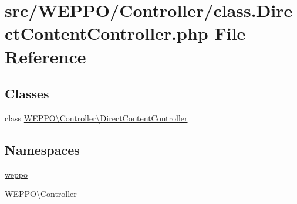 \hypertarget{class_8DirectContentController_8php}{}\section{src/\+W\+E\+P\+P\+O/\+Controller/class.Direct\+Content\+Controller.\+php File Reference}
\label{class_8DirectContentController_8php}
\subsection*{Classes}
\begin{DoxyCompactItemize}
\item 
class \hyperlink{classWEPPO_1_1Controller_1_1DirectContentController}{W\+E\+P\+P\+O\textbackslash{}\+Controller\textbackslash{}\+Direct\+Content\+Controller}
\end{DoxyCompactItemize}
\subsection*{Namespaces}
\begin{DoxyCompactItemize}
\item 
 \hyperlink{namespaceweppo}{weppo}
\item 
 \hyperlink{namespaceWEPPO_1_1Controller}{W\+E\+P\+P\+O\textbackslash{}\+Controller}
\end{DoxyCompactItemize}
